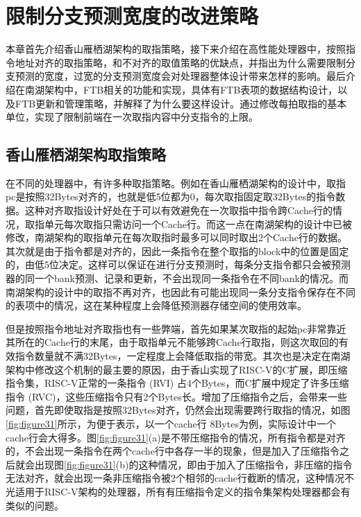 \chapter{限制分支预测宽度的改进策略}

本章首先介绍香山雁栖湖架构的取指策略，接下来介绍在高性能处理器中，按照指令地址对齐的取指策略，和不对齐的取值策略的优缺点，并指出为什么需要限制分支预测的宽度，过宽的分支预测宽度会对处理器整体设计带来怎样的影响。最后介绍在南湖架构中，FTB相关的功能和实现，具体有FTB表项的数据结构设计，以及FTB更新和管理策略，并解释了为什么要这样设计。通过修改每拍取指的基本单位，实现了限制前端在一次取指内容中分支指令的上限。

\section{香山雁栖湖架构取指策略}

在不同的处理器中，有许多种取指策略。例如在香山雁栖湖架构的设计中，取指pc是按照32Bytes对齐的，也就是低5位都为0，每次取指固定取32Bytes的指令数据。这种对齐取指设计好处在于可以有效避免在一次取指中指令跨Cache行的情况，取指单元每次取指只需访问一个Cache行。而这一点在南湖架构的设计中已被修改，南湖架构的取指单元在每次取指时最多可以同时取出2个Cache行的数据。其次就是由于指令都是对齐的，因此一条指令在整个取指的block中的位置是固定的，由低5位决定。这样可以保证在进行分支预测时，每条分支指令都只会被预测器的同一个bank预测、记录和更新，不会出现同一条指令在不同bank的情况。而南湖架构的设计中的取指不再对齐，也因此有可能出现同一条分支指令保存在不同的表项中的情况，这在某种程度上会降低预测器存储空间的使用效率。

但是按照指令地址对齐取指也有一些弊端，首先如果某次取指的起始pc非常靠近其所在的Cache行的末尾，由于取指单元不能够跨Cache行取指，则这次取回的有效指令数量就不满32Bytes，一定程度上会降低取指的带宽。其次也是决定在南湖架构中修改这个机制的最主要的原因，由于香山实现了RISC-V的C扩展，即压缩指令集，RISC-V正常的一条指令 (RVI) 占4个Bytes，而C扩展中规定了许多压缩指令 (RVC)，这些压缩指令只有2个Bytes长。增加了压缩指令之后，会带来一些问题，首先即使取指是按照32Bytes对齐，仍然会出现需要跨行取指的情况，如图\ref{fig:figure31}所示，为便于表示，以一个cache行 8Bytes为例，实际设计中一个cache行会大得多。图\ref{fig:figure31}(a)是不带压缩指令的情况，所有指令都是对齐的，不会出现一条指令在两个cache行中各存一半的现象，但是加入了压缩指令之后就会出现图\ref{fig:figure31}(b)的这种情况，即由于加入了压缩指令，非压缩的指令无法对齐，就会出现一条非压缩指令被2个相邻的cache行截断的情况，这种情况不光适用于RISC-V架构的处理器，所有有压缩指令定义的指令集架构处理器都会有类似的问题。

